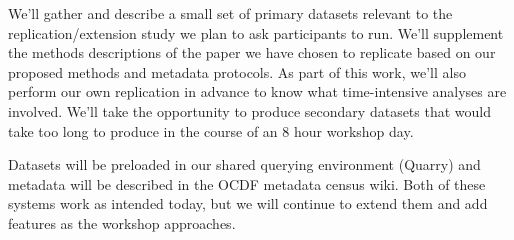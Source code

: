 We'll gather and describe a small set of primary datasets relevant to the replication/extension study we plan to ask participants to run.  We'll supplement the methods descriptions of the paper we have chosen to replicate based on our proposed methods and metadata protocols.  As part of this work, we'll also perform our own replication in advance to know what time-intensive analyses are involved.  We'll take the opportunity to produce secondary datasets that would take too long to produce in the course of an 8 hour workshop day.

Datasets will be preloaded in our shared querying environment (Quarry) and metadata will be described in the OCDF metadata census wiki.  Both of these systems work as intended today, but we will continue to extend them and add features as the workshop approaches.
